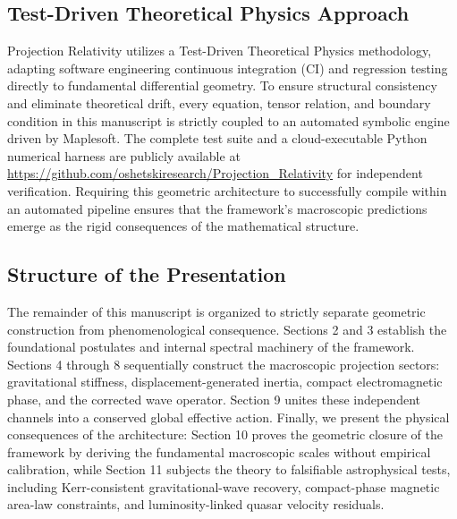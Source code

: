 \documentclass[11pt]{article}
\begin{document}
\subsection{Test-Driven Theoretical Physics Approach}
Projection Relativity utilizes a Test-Driven Theoretical Physics methodology, adapting software engineering continuous integration (CI) and regression testing directly to fundamental differential geometry. To ensure structural consistency and eliminate theoretical drift, every equation, tensor relation, and boundary condition in this manuscript is strictly coupled to an automated symbolic engine driven by Maplesoft. The complete test suite and a cloud-executable Python numerical harness are publicly available at \url{https://github.com/oshetskiresearch/Projection_Relativity} for independent verification. Requiring this geometric architecture to successfully compile within an automated pipeline ensures that the framework's macroscopic predictions emerge as the rigid consequences of the mathematical structure.

\subsection{Structure of the Presentation} The remainder of this manuscript is organized to strictly separate geometric construction from phenomenological consequence. Sections 2 and 3 establish the foundational postulates and internal spectral machinery of the framework. Sections 4 through 8 sequentially construct the macroscopic projection sectors: gravitational stiffness, displacement-generated inertia, compact electromagnetic phase, and the corrected wave operator. Section 9 unites these independent channels into a conserved global effective action. Finally, we present the physical consequences of the architecture: Section 10 proves the geometric closure of the framework by deriving the fundamental macroscopic scales without empirical calibration, while Section 11 subjects the theory to falsifiable astrophysical tests, including
Kerr-consistent gravitational-wave recovery, compact-phase magnetic area-law constraints, and luminosity-linked quasar velocity residuals.
\end{document}
